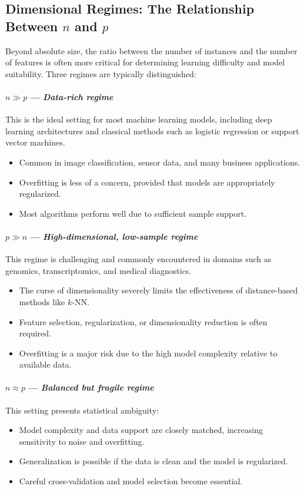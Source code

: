 \documentclass[12pt,openany]{book}
\begin{document}
\subsection{Dimensional Regimes: The Relationship Between \(n\) and \(p\)}

Beyond absolute size, the ratio between the number of instances and the number of features is often more critical for determining learning difficulty and model suitability. Three regimes are typically distinguished:

\paragraph{\(n \gg p\) --- \textit{Data-rich regime}}
This is the ideal setting for most machine learning models, including deep learning architectures and classical methods such as logistic regression or support vector machines.
\begin{itemize}
    \item Common in image classification, sensor data, and many business applications.
    \item Overfitting is less of a concern, provided that models are appropriately regularized.
    \item Most algorithms perform well due to sufficient sample support.
\end{itemize}

\paragraph{\(p \gg n\) --- \textit{High-dimensional, low-sample regime}}
This regime is challenging and commonly encountered in domains such as genomics, transcriptomics, and medical diagnostics.
\begin{itemize}
    \item The curse of dimensionality severely limits the effectiveness of distance-based methods like \(k\)-NN.
    \item Feature selection, regularization, or dimensionality reduction is often required.
    \item Overfitting is a major risk due to the high model complexity relative to available data.
\end{itemize}

\paragraph{\(n \approx p\) --- \textit{Balanced but fragile regime}}
This setting presents statistical ambiguity:
\begin{itemize}
    \item Model complexity and data support are closely matched, increasing sensitivity to noise and overfitting.
    \item Generalization is possible if the data is clean and the model is regularized.
    \item Careful cross-validation and model selection become essential.
\end{itemize}
\end{document}
